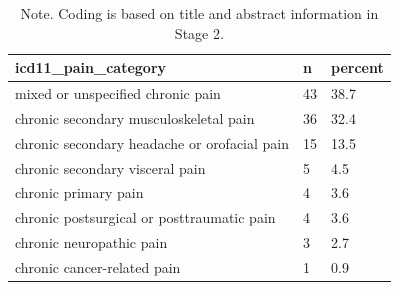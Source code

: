 \begin{table}[htbp]
\raggedright
\caption{ICD-11 pain classifications assigned in Stage 2.}
\label{tab.icd11}
\begin{tabular}{lll}
\toprule
icd11\_pain\_category & n & percent \\
\midrule
mixed or unspecified chronic pain & 43 & 38.7 \\
chronic secondary musculoskeletal pain & 36 & 32.4 \\
chronic secondary headache or orofacial pain & 15 & 13.5 \\
chronic secondary visceral pain & 5 & 4.5 \\
chronic primary pain & 4 & 3.6 \\
chronic postsurgical or posttraumatic pain & 4 & 3.6 \\
chronic neuropathic pain & 3 & 2.7 \\
chronic cancer-related pain & 1 & 0.9 \\
\bottomrule
\end{tabular}

\caption*{Note. Coding is based on title and abstract information in Stage 2.}
\end{table}

